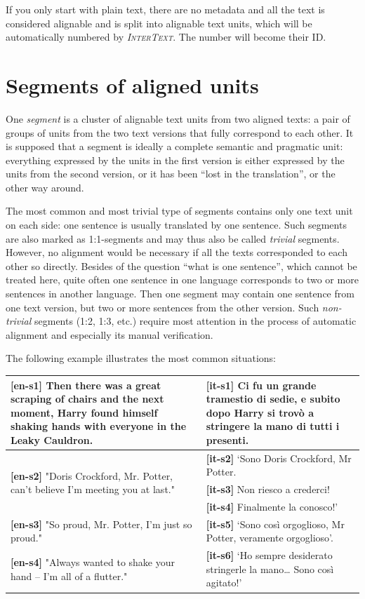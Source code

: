 \documentclass[a4paper,10pt,oneside]{book}
\newcommand{\IT}{\textit{\textsc{InterText}}\xspace}
\begin{document}
If you only start with plain text, there are no metadata and all the text is considered alignable and is split into alignable text units, which will be automatically numbered by \IT. The number will become their ID.

\section{Segments of aligned units}\label{ch:intro:albasics:segments}

One \emph{segment} is a cluster of alignable text units from two aligned texts: a pair of groups of units from the two text versions that fully correspond to each other. It is supposed that a segment is ideally a complete semantic and pragmatic unit: everything expressed by the units in the first version is either expressed by the units from the second version, or it has been ``lost in the translation'', or the other way around.

The most common and most trivial type of segments contains only one text unit on each side: one sentence is usually translated by one sentence. Such segments are also marked as 1:1-segments and may thus also be called \emph{trivial} segments. However, no alignment would be necessary if all the texts corresponded to each other so directly. Besides of the question ``what is one sentence'', which cannot be treated here, quite often one sentence in one language corresponds to two or more sentences in another language. Then one segment may contain one sentence from one text version, but two or more sentences from the other version. Such \emph{non-trivial} segments (1:2, 1:3, etc.) require most attention in the process of automatic alignment and especially its manual verification.

The following example illustrates the most common situations:

\vspace{1.5ex}
\begin{tabular}{|p{}|p{}|}
\hline
\textbf{[en-s1]} Then there was a great scraping of chairs and the next moment, Harry found himself shaking hands with everyone in the Leaky Cauldron. &
\textbf{[it-s1]} Ci fu un grande tramestio di sedie, e subito dopo Harry si trovò a stringere la mano di tutti i presenti. \\
\hline
\multirow{3}{0.4\textwidth}{\textbf{[en-s2]} "Doris Crockford, Mr. Potter, can't believe I'm meeting you at last."}
&
\textbf{[it-s2]} ‘Sono Doris Crockford, Mr Potter. \\
& \textbf{[it-s3]} Non riesco a crederci! \\
& \textbf{[it-s4]} Finalmente la conosco!’ \\
\hline
\textbf{[en-s3]} "So proud, Mr. Potter, I'm just so proud."
&
\textbf{[it-s5]} ‘Sono così orgoglioso, Mr Potter, veramente orgoglioso’. \\
\hline
\textbf{[en-s4]} "Always wanted to shake your hand -- I'm all of a flutter."
&
\textbf{[it-s6]} ‘Ho sempre desiderato stringerle la mano… Sono così agitato!’ \\
\hline
\end{tabular}
\vspace{1.5ex}
\end{document}
